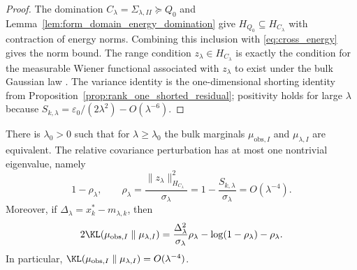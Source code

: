 \begin{proof}
The domination $C_\lambda=\Sigma_{\lambda,II}\succeq Q_0$ and
Lemma~\ref{lem:form_domain_energy_domination} give
$H_{Q_0}\subseteq H_{C_\lambda}$ with contraction of energy norms.  Combining
this inclusion with \eqref{eq:cross_energy} gives the norm bound.  The range
condition $z_\lambda\in H_{C_\lambda}$ is exactly the condition for the
measurable Wiener functional associated with $z_\lambda$ to exist under the bulk
Gaussian law \cite{bogachev1998gaussian,steinwart2024conditioning}.  The variance identity is the
one-dimensional shorting identity from Proposition~\ref{prop:rank_one_shorted_residual};
positivity holds for large $\lambda$ because
$S_{k,\lambda}=\varepsilon_0/(2\lambda^2)-O(\lambda^{-6})$.
\end{proof}

\begin{lemma}
\label{lem:feldman_hajek}
There is $\lambda_0>0$ such that for $\lambda\ge\lambda_0$ the bulk marginals
$\mu_{\mathrm{obs},I}$ and $\mu_{\lambda,I}$ are equivalent.  The relative
covariance perturbation has at most one nontrivial eigenvalue, namely
\begin{equation}
  1-\rho_\lambda,
  \qquad
  \rho_\lambda
  =
  \frac{\|z_\lambda\|_{H_{C_\lambda}}^2}{\sigma_\lambda}
  =
  1-\frac{S_{k,\lambda}}{\sigma_\lambda}
  =O(\lambda^{-4}).
  \label{eq:rho_lambda_rank_one}
\end{equation}
Moreover, if $\Delta_\lambda=x_k^*-m_{\lambda,k}$, then
\begin{equation}
  2\KL(\mu_{\mathrm{obs},I}\parallel\mu_{\lambda,I})
  =
  \frac{\Delta_\lambda^2}{\sigma_\lambda}\rho_\lambda
  -\log(1-\rho_\lambda)-\rho_\lambda.
  \label{eq:bulk_KL_rank_one}
\end{equation}
In particular,
$\KL(\mu_{\mathrm{obs},I}\parallel\mu_{\lambda,I})=O(\lambda^{-4})$.
\end{lemma}

